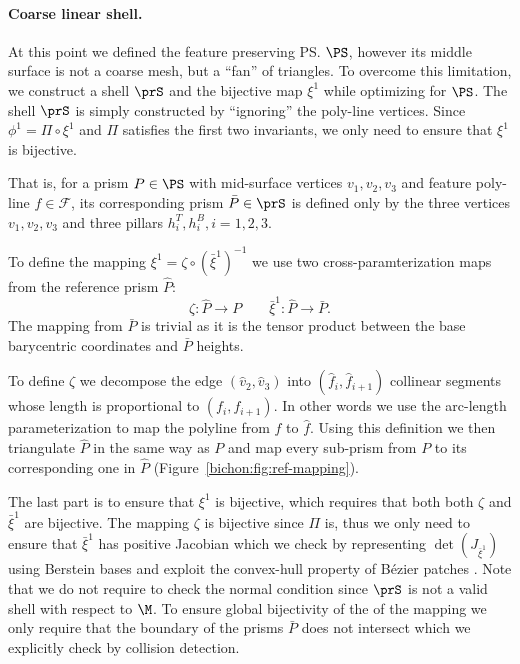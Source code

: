 \paragraph{Coarse linear shell.} 
At this point we defined the feature preserving \ps{} $\PS$, however its middle surface is not a coarse mesh, but a ``fan'' of triangles.
To overcome this limitation, we construct a shell $\prS$ and the bijective map $\xi^1$ while optimizing for $\PS$. The shell $\prS$ is simply constructed by ``ignoring'' the poly-line vertices. Since $\phi^1 = \Pi \circ \xi^1$ and $\Pi$ satisfies the first two invariants, we only need to ensure that $\xi^1$ is bijective.

That is, for a prism $P\in\PS$ with mid-surface vertices $v_1, v_2, v_3$ and feature poly-line $f\in\mathcal{F}$, its corresponding prism $\bar P \in \prS$ is defined only by the three vertices $v_1, v_2, v_3$ and three pillars $h_i^T, h_i^B, i=1,2,3$.

To define the mapping $\xi^1 = \zeta\circ(\bar\xi^1)^{-1}$ we use two cross-paramterization maps from the reference prism $\hat P$: 
\[
\zeta \colon \hat P \to P \qquad
\bar\xi^1 \colon \hat P \to \bar P.
\]
The mapping from $\bar P$ is trivial as it is the tensor product between the base barycentric coordinates and $\bar P$ heights.

To define $\zeta$ we decompose the edge $(\hat v_2, \hat v_3)$ into $(\hat f_i, \hat f_{i+1})$ collinear segments whose length is proportional to $(f_i, f_{i+1})$. In other words we use the arc-length parameterization to map the polyline from $f$ to $\hat f$. Using this definition we then triangulate $\hat P$ in the same way as $P$ and map every sub-prism from $P$ to its corresponding one in $\hat P$ (Figure~\ref{bichon:fig:ref-mapping}).

The last part is to ensure that $\xi^1$ is bijective, which requires that both both $\zeta$ and $\bar\xi^1$ are bijective. The mapping $\zeta$ is bijective since $\Pi$ is, thus we only need to ensure that $\bar\xi^1$ has positive Jacobian which we check by representing $\det(J_{\bar\xi^1})$ using Berstein bases and exploit the convex-hull property of B\'ezier patches \cite{johnen2013geometrical}. Note that we do not require to check the normal condition since $\prS$ is not a valid shell with respect to $\M$.
To ensure global bijectivity of the  of the mapping we only require that the boundary of the prisms $\bar P$ does not intersect which we explicitly check by collision detection. 

